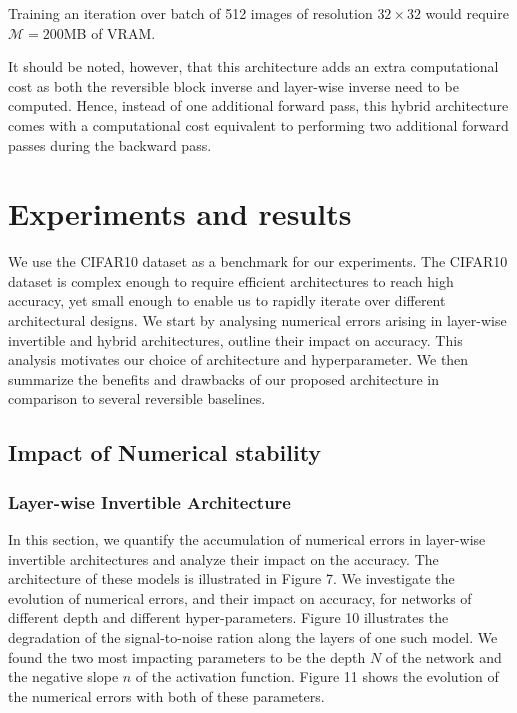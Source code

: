 \documentclass[twocolumn]{bmcart}
\begin{document}
Training an iteration over batch of 512 images of resolution $32 \times 32$ would require $\mathcal{M}=200$MB of VRAM.

It should be noted, however, that this architecture adds an extra computational cost as both the reversible block inverse and layer-wise inverse need to be computed.
Hence, instead of one additional forward pass, this hybrid architecture comes with a computational cost equivalent to performing two additional forward passes
during the backward pass. 


\section{Experiments and results}

We use the CIFAR10 dataset as a benchmark for our experiments.
The CIFAR10 dataset is complex enough to require efficient architectures to reach high accuracy, 
yet small enough to enable us to rapidly iterate over different architectural designs.
We start by analysing numerical errors arising in layer-wise invertible and hybrid architectures, 
outline their impact on accuracy.
This analysis motivates our choice of architecture and hyperparameter.
We then summarize the benefits and drawbacks of our proposed architecture in comparison to several reversible baselines.

\subsection{Impact of Numerical stability}

\subsubsection{Layer-wise Invertible Architecture}

In this section, we quantify the accumulation of numerical errors in layer-wise invertible architectures and analyze their impact on the accuracy.
The architecture of these models is illustrated in Figure 7.
We investigate the evolution of numerical errors, and their impact on accuracy, for networks of different depth and different hyper-parameters.
Figure 10 illustrates the degradation of the signal-to-noise ration along the layers of one such model. 
We found the two most impacting parameters to be the depth $N$ of the network and the negative slope $n$ of the activation function.
Figure 11 shows the evolution of the numerical errors with both of these parameters.
\end{document}

